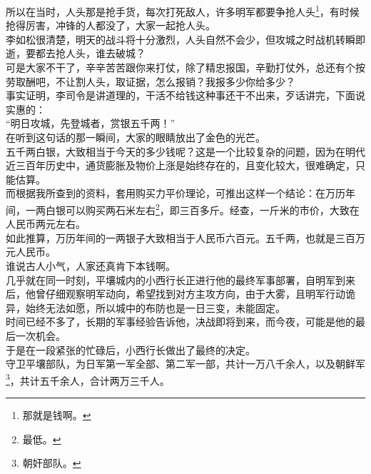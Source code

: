 \begin{multicols}{\theparacolNo}
所以在当时，人头那是抢手货，每次打死敌人，许多明军都要争抢人头\footnote{那就是钱啊。}，有时候抢得厉害，冲锋的人都没了，大家一起抢人头。\\

李如松很清楚，明天的战斗将十分激烈，人头自然不会少，但攻城之时战机转瞬即逝，要都去抢人头，谁去破城？\\

可是大家不干了，辛辛苦苦跟你来打仗，除了精忠报国，辛勤打仗外，总还有个按劳取酬吧，不让割人头，取证据，怎么报销？我报多少你给多少？\\

事实证明，李司令是讲道理的，干活不给钱这种事还干不出来，歹话讲完，下面说实惠的：\\

“明日攻城，先登城者，赏银五千两！”\\

在听到这句话的那一瞬间，大家的眼睛放出了金色的光芒。\\

五千两白银，大致相当于今天的多少钱呢？这是一个比较复杂的问题，因为在明代近三百年历史中，通货膨胀及物价上涨是始终存在的，且变化较大，很难确定，只能估算。\\

而根据我所查到的资料，套用购买力平价理论，可推出这样一个结论：在万历年间，一两白银可以购买两石米左右\footnote{最低。}，即三百多斤。经查，一斤米的市价，大致在人民币两元左右。\\

如此推算，万历年间的一两银子大致相当于人民币六百元。五千两，也就是三百万元人民币。\\

谁说古人小气，人家还真肯下本钱啊。\\

几乎就在同一时刻，平壤城内的小西行长正进行他的最终军事部署，自明军到来后，他曾仔细观察明军动向，希望找到对方主攻方向，由于大雾，且明军行动诡异，始终无法如愿，所以城中的布防也是一日三变，未能固定。\\

时间已经不多了，长期的军事经验告诉他，决战即将到来，而今夜，可能是他的最后一次机会。\\

于是在一段紧张的忙碌后，小西行长做出了最终的决定。\\

守卫平壤部队，为日军第一军全部、第二军一部，共计一万八千余人，以及朝鲜军\footnote{朝奸部队。}，共计五千余人，合计两万三千人。\\


\end{multicols}
